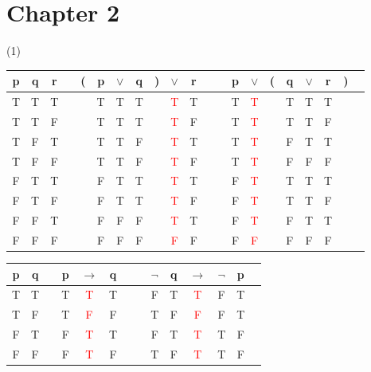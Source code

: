     \section*{Chapter 2}
\begin{Solution}{2.1}
\quad
    \begin{tasks}(1)
        \task
\begin{tabular}{@{ }c@{ }@{ }c@{ }@{ }c | c@{ }@{}c@{}@{ }c@{ }@{ }c@{ }@{ }c@{ }@{}c@{}@{ }c@{ }@{ }c@{ }@{ }c | c@{ }@{ }c@{ }@{ }c@{ }@{}c@{}@{ }c@{ }@{ }c@{ }@{ }c@{ }@{}c@{}@{ }c}
p & q & r &  & ( & p & $\lor$ & q & ) & $\lor$ & r &  &  & p & $\lor$ & ( & q & $\lor$ & r & ) & \\
\hline
T & T & T &  &  & T & T & T &  & \textcolor{red}{T} & T &  &  & T & \textcolor{red}{T} &  & T & T & T &  & \\
T & T & F &  &  & T & T & T &  & \textcolor{red}{T} & F &  &  & T & \textcolor{red}{T} &  & T & T & F &  & \\
T & F & T &  &  & T & T & F &  & \textcolor{red}{T} & T &  &  & T & \textcolor{red}{T} &  & F & T & T &  & \\
T & F & F &  &  & T & T & F &  & \textcolor{red}{T} & F &  &  & T & \textcolor{red}{T} &  & F & F & F &  & \\
F & T & T &  &  & F & T & T &  & \textcolor{red}{T} & T &  &  & F & \textcolor{red}{T} &  & T & T & T &  & \\
F & T & F &  &  & F & T & T &  & \textcolor{red}{T} & F &  &  & F & \textcolor{red}{T} &  & T & T & F &  & \\
F & F & T &  &  & F & F & F &  & \textcolor{red}{T} & T &  &  & F & \textcolor{red}{T} &  & F & T & T &  & \\
F & F & F &  &  & F & F & F &  & \textcolor{red}{F} & F &  &  & F & \textcolor{red}{F} &  & F & F & F &  & \\
\end{tabular}

        \task
\begin{tabular}{@{ }c@{ }@{ }c | c@{ }@{ }c@{ }@{ }c@{ }@{ }c@{ }@{ }c | c@{ }@{ }c@{ }@{ }c@{ }@{ }c@{ }@{ }c@{ }@{ }c@{ }@{ }c}
p & q &  & p & $\rightarrow$ & q &  &  & $\lnot$ & q & $\rightarrow$ & $\lnot$ & p & \\
\hline
T & T &  & T & \textcolor{red}{T} & T &  &  & F & T & \textcolor{red}{T} & F & T & \\
T & F &  & T & \textcolor{red}{F} & F &  &  & T & F & \textcolor{red}{F} & F & T & \\
F & T &  & F & \textcolor{red}{T} & T &  &  & F & T & \textcolor{red}{T} & T & F & \\
F & F &  & F & \textcolor{red}{T} & F &  &  & T & F & \textcolor{red}{T} & T & F & \\
\end{tabular}


\end{tasks}
\end{Solution}
